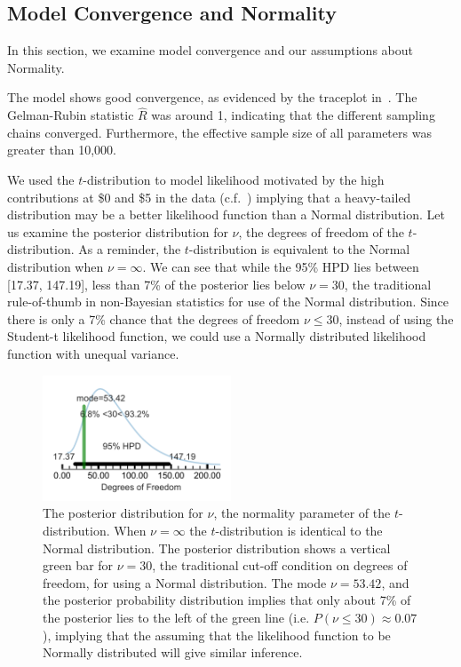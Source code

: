 \subsection{Model Convergence and Normality}
\label{sub:Posterior Checks, Convergence and Normality}

In this section, we examine model convergence and our assumptions about Normality.

The model shows good convergence, as evidenced by the traceplot in~. The Gelman-Rubin statistic $\hat{R}$ was around 1, indicating that the different sampling chains converged. Furthermore, the effective sample size of all parameters was greater than 10,000.

We used the $t$-distribution to model likelihood motivated by the high contributions at \$0 and \$5 in the data (c.f.~) implying that a heavy-tailed distribution may be a better likelihood function than a  Normal distribution. Let us examine the posterior distribution for $\nu$, the degrees of freedom of the $t$-distribution. As a reminder, the $t$-distribution is equivalent to the Normal distribution when $\nu=\infty$. We can see that while the 95\% HPD lies between [17.37, 147.19], less than 7\% of the posterior lies below $\nu=30$, the traditional rule-of-thumb in non-Bayesian statistics for use of the Normal distribution. Since there is only a 7\% chance that the degrees of freedom $\nu \leq 30$, instead of using the Student-t likelihood function, we could use a Normally distributed likelihood function with unequal variance.


\begin{figure}[htb]
    \includegraphics[width=0.5\textwidth]{./figures/robust_normality_font_fixed.pdf}
    \caption{The posterior distribution for $\nu$, the normality parameter of the $t$-distribution. When $\nu=\infty$ the $t$-distribution is identical to the Normal distribution. The posterior distribution shows a vertical green bar for $\nu=30$, the traditional cut-off condition on degrees of freedom, for using a Normal distribution. The mode $\nu=53.42$, and the posterior probability distribution implies that only about 7\% of the posterior lies to the left of the green line (i.e. $P(\nu \leq 30) \approx 0.07$), implying that the assuming that the likelihood function to be Normally distributed will give similar inference.}
    \label{fig:normality}
\end{figure}

